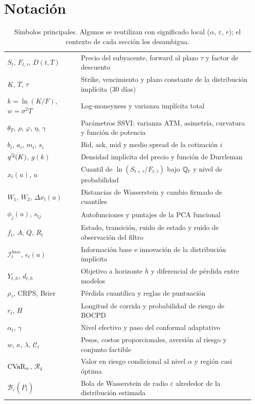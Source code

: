 \clearpage
\section{Notación}\label{ap:notacion}

\begin{table}[H]
\centering\small
\caption{Símbolos principales. Algunos se reutilizan con significado local ($\alpha$, $\varepsilon$, $r$);
el contexto de cada sección los desambigua.}
\label{tab:notacion}
\begin{tabularx}{\linewidth}{@{}l Y@{}}
\toprule
{} & \\
\midrule
$S_t$, $F_{t,\tau}$, $D(t,T)$ & Precio del subyacente, forward al plazo $\tau$ y factor de descuento\\
$K$, $T$, $\tau$ & Strike, vencimiento y plazo constante de la distribución implícita (30 días)\\
$k=\ln(K/F)$, $w=\sigma^2T$ & Log-moneyness y varianza implícita total\\
$\theta_T$, $\rho$, $\varphi$, $\eta$, $\gamma$ & Parámetros SSVI: varianza ATM, asimetría, curvatura y función de potencia\\
$b_i$, $a_i$, $m_i$, $s_i$ & Bid, ask, mid y medio spread de la cotización $i$\\
$q^{\mathbb{Q}}(K)$, $g(k)$ & Densidad implícita del precio y función de Durrleman\\
$x_t(u)$, $u$ & Cuantil de $\ln(S_{t+\tau}/F_{t,\tau})$ bajo $\mathbb{Q}_t$ y nivel de probabilidad\\
$W_1$, $W_2$, $\Delta x_t(u)$ & Distancias de Wasserstein y cambio firmado de cuantiles\\
$\phi_j(u)$, $s_{tj}$ & Autofunciones y puntajes de la PCA funcional\\
$f_t$, $A$, $Q$, $R_t$ & Estado, transición, ruido de estado y ruido de observación del filtro\\
$\mathcal I^{base}_t$, $\epsilon_t(u)$ & Información base e innovación de la distribución implícita\\
$Y_{t,h}$, $d_{t,h}$ & Objetivo a horizonte $h$ y diferencial de pérdida entre modelos\\
$\rho_\tau$, CRPS, Brier & Pérdida cuantílica y reglas de puntuación\\
$r_t$, $H$ & Longitud de corrida y probabilidad de riesgo de BOCPD\\
$\alpha_t$, $\gamma$ & Nivel efectivo y paso del conformal adaptativo\\
$w$, $\kappa$, $\lambda$, $\mathcal C_t$ & Pesos, costos proporcionales, aversión al riesgo y conjunto factible\\
$\operatorname{CVaR}_\alpha$, $\mathcal R_\delta$ & Valor en riesgo condicional al nivel $\alpha$ y región casi óptima\\
$\mathcal B_\varepsilon(\widehat P_t)$ & Bola de Wasserstein de radio $\varepsilon$ alrededor de la distribución estimada\\
\bottomrule
\end{tabularx}
\end{table}

